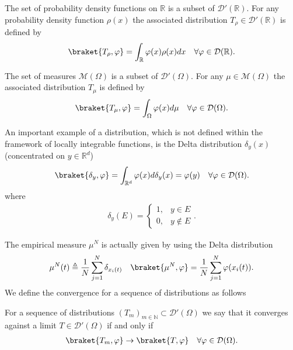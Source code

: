 \begin{example}
 The set of probability density functions on $\mathbb{R}$ is a subset of $\mathcal{D}'(\mathbb{R} )$.
 For any probability density function $\rho(x)$ the associated distribution  $T_\rho \in \mathcal{D}'(\mathbb{R})$
 is defined by
 \begin{align*}
   \braket{T_\rho,\phi } = \int_\mathbb{R} \phi(x) \rho(x) dx \quad \forall  \phi  \in \mathcal{D}(\mathbb{R})
 .\end{align*}
\end{example}
\begin{example}
 The set of  measures  $\mathcal{M}(\Omega )$ is a subset of $\mathcal{D}'(\Omega )$. 
 For any $\mu \in \mathcal{M}(\Omega )$ the associated distribution $T_{\mu }$ is defined by 
 \begin{align*}
   \braket{T_\mu ,\phi } = \int_\Omega \phi(x) d\mu  \quad \forall \phi  \in \mathcal{D}(\Omega )
 .\end{align*}
\end{example}
\begin{example}
 An important example of a distribution, which is not defined within the framework of locally integrable functions, is the Delta distribution $\delta_y(x)$  (concentrated on $y \in  \mathbb{R}^{d} $) 
 \begin{align*}
   \braket{\delta_y,\phi } = \int_{\mathbb{R}^{d} } \phi(x) d \delta_y(x) = \phi(y) \quad \forall \phi  \in \mathcal{D}(\Omega )
 .\end{align*}
 where 
 \begin{align*}
  \delta_y(E) = \begin{cases}
    1, &y \in  E \\
    0,&y \notin E
  \end{cases}
 .\end{align*}
\end{example}
The empirical measure $\mu ^{N} $ is actually given by using the Delta distribution 
\begin{align*}
  \mu ^{N}(t) \triangleq \frac{1}{N} \sum_{j=1}^{N} \delta_{x_i(t)}   \quad \braket{\mu ^{N},\phi  } = \frac{1}{N} \sum_{j=1}^{N} \phi(x_i(t)) 
.\end{align*}
We define the convergence for a sequence of distributions as follows 
\begin{definition}
  For a sequence of distributions $(T_m)_{m \in  \mathbb{N}} \subset  \mathcal{D}'(\Omega )$  we say that it converges against
  a limit $T \in \mathcal{D}'(\Omega )$ if and only if
  \begin{align*}
    \braket {T_m,\phi } \to \braket{T,\phi } \quad \forall \phi  \in \mathcal{D}(\Omega )
  .\end{align*}
\end{definition}

